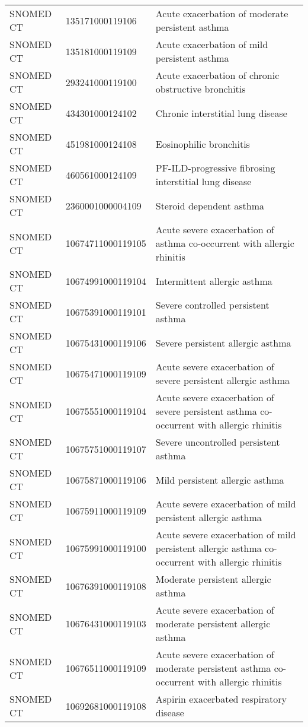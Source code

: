 \begin{table}[ht]
\begin{tabular}{lll}
  SNOMED CT & 135171000119106 & Acute exacerbation of moderate persistent asthma \\ 
  SNOMED CT & 135181000119109 & Acute exacerbation of mild persistent asthma \\ 
  SNOMED CT & 293241000119100 & Acute exacerbation of chronic obstructive bronchitis \\ 
  SNOMED CT & 434301000124102 & Chronic interstitial lung disease \\ 
  SNOMED CT & 451981000124108 & Eosinophilic bronchitis \\ 
  SNOMED CT & 460561000124109 & PF-ILD-progressive fibrosing interstitial lung disease \\ 
  SNOMED CT & 2360001000004109 & Steroid dependent asthma \\ 
  SNOMED CT & 10674711000119105 & Acute severe exacerbation of asthma co-occurrent with allergic rhinitis \\ 
  SNOMED CT & 10674991000119104 & Intermittent allergic asthma \\ 
  SNOMED CT & 10675391000119101 & Severe controlled persistent asthma \\ 
  SNOMED CT & 10675431000119106 & Severe persistent allergic asthma \\ 
  SNOMED CT & 10675471000119109 & Acute severe exacerbation of severe persistent allergic asthma \\ 
  SNOMED CT & 10675551000119104 & Acute severe exacerbation of severe persistent asthma co-occurrent with allergic rhinitis \\ 
  SNOMED CT & 10675751000119107 & Severe uncontrolled persistent asthma \\ 
  SNOMED CT & 10675871000119106 & Mild persistent allergic asthma \\ 
  SNOMED CT & 10675911000119109 & Acute severe exacerbation of mild persistent allergic asthma \\ 
  SNOMED CT & 10675991000119100 & Acute severe exacerbation of mild persistent allergic asthma co-occurrent with allergic rhinitis \\ 
  SNOMED CT & 10676391000119108 & Moderate persistent allergic asthma \\ 
  SNOMED CT & 10676431000119103 & Acute severe exacerbation of moderate persistent allergic asthma \\ 
  SNOMED CT & 10676511000119109 & Acute severe exacerbation of moderate persistent asthma co-occurrent with allergic rhinitis \\ 
  SNOMED CT & 10692681000119108 & Aspirin exacerbated respiratory disease \\ 

\end{tabular}
\end{table}
